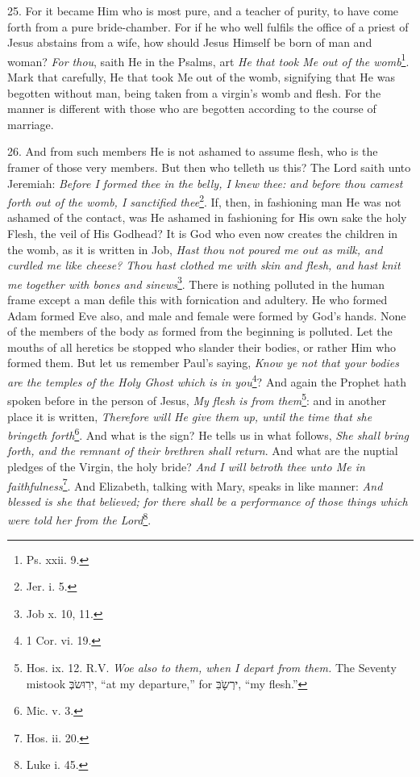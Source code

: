 25. For it became Him who is most pure, and a teacher of purity, to have come forth from a pure bride-chamber. For if he who well fulfils the office of a priest of Jesus abstains from a wife, how should Jesus Himself be born of man and woman? \emph{For thou}, saith He in the Psalms, art \emph{He that took Me out of the womb}\footnote{Ps. xxii. 9.}. Mark that carefully, He that took Me out of the womb, signifying that He was begotten without man, being taken from a virgin’s womb and flesh. For the manner is different with those who are begotten according to the course of marriage.

26. And from such members He is not ashamed to assume flesh, who is the framer of those very members. But then who telleth us this? The Lord saith unto Jeremiah: \emph{Before I formed thee in the belly, I knew thee: and before thou camest forth out of the womb, I sanctified thee}\footnote{Jer. i. 5.}. If, then, in fashioning man He was not ashamed of the contact, was He ashamed in fashioning for His own sake the holy Flesh, the veil of His Godhead? It is God who even now creates the children in the womb, as it is written in Job, \emph{Hast thou not poured me out as milk, and curdled me like cheese? Thou hast clothed me with skin and flesh, and hast knit me together with bones and sinews}\footnote{Job x. 10, 11.}. There is nothing polluted in the human frame except a man defile this with fornication and adultery. He who formed Adam formed Eve also, and male and female were formed by God’s hands. None of the members of the body as formed from the beginning is polluted. Let the mouths of all heretics be stopped who slander their bodies, or rather Him who formed them. But let us remember Paul’s saying, \emph{Know ye not that your bodies are the temples of the Holy Ghost which is in you}\footnote{1 Cor. vi. 19.}? And again the Prophet hath spoken before in the person of Jesus, \emph{My flesh is from them}\footnote{Hos. ix. 12. R.V. \emph{Woe also to them, when I depart from them.} The Seventy mistook \texthebrew{י\texthebrew{רִוּשֹבְּ}}, “at my departure,” for \texthebrew{י\texthebrew{רְשָֹבִּ}}, “my flesh.”}: and in another place it is written, \emph{Therefore will He give them up, until the time that she bringeth forth}\footnote{Mic. v. 3.}. And what is the sign? He tells us in what follows, \emph{She shall bring forth, and the remnant of their brethren shall return}. And what are the nuptial pledges of the Virgin, the holy bride? \emph{And I will betroth thee unto Me in faithfulness}\footnote{Hos. ii. 20.}. And Elizabeth, talking with Mary, speaks in like manner: \emph{And blessed is she that believed; for there shall be a performance of those things which were told her from the Lord}\footnote{Luke i. 45.}.

